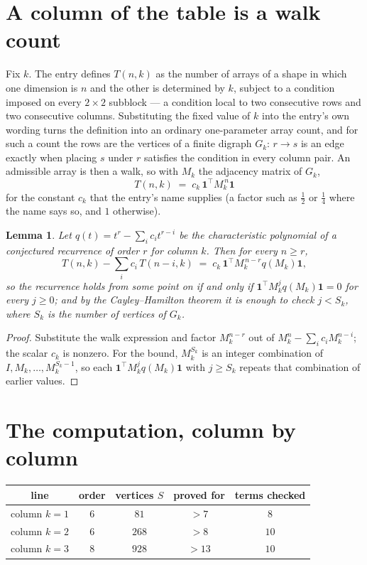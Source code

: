 \documentclass[11pt,a4paper]{article}
\theoremstyle{plain}
\newtheorem{lemma}[theorem]{Lemma}
\theoremstyle{definition}
\begin{document}
\section{A column of the table is a walk count}

Fix $k$. The entry defines $T(n,k)$ as the number of arrays of a shape in which one dimension
is $n$ and the other is determined by $k$, subject to a condition imposed on every
$2\times2$ subblock --- a condition local to two consecutive rows and two consecutive columns.
Substituting the fixed value of $k$ into the entry's own wording turns the definition into an
ordinary one-parameter array count, and for such a count the rows are the vertices of a finite
digraph $G_k$: $r\to s$ is an edge exactly when placing $s$ under $r$ satisfies the condition
in every column pair. An admissible array is then a walk, so with $M_k$ the adjacency matrix
of $G_k$,
\[
T(n,k)\;=\;c_k\,\mathbf{1}^{\!\top}M_k^{\,n}\mathbf{1}
\]
for the constant $c_k$ that the entry's name supplies (a factor such as $\tfrac12$ or
$\tfrac14$ where the name says so, and $1$ otherwise).

\begin{lemma}\label{lem:crit}
Let $q(t)=t^{r}-\sum_i c_it^{r-i}$ be the characteristic polynomial of a conjectured
recurrence of order $r$ for column $k$. Then for every $n\ge r$,
\[
T(n,k)-\sum_i c_i\,T(n-i,k)\;=\;c_k\,\mathbf{1}^{\!\top}M_k^{\,n-r}q(M_k)\mathbf{1},
\]
so the recurrence holds from some point on if and only if
$\mathbf{1}^{\!\top}M_k^{j}q(M_k)\mathbf{1}=0$ for every $j\ge0$; and by the
Cayley--Hamilton theorem it is enough to check $j<S_k$, where $S_k$ is the number of vertices
of $G_k$.
\end{lemma}

\begin{proof}
Substitute the walk expression and factor $M_k^{n-r}$ out of $M_k^{n}-\sum_ic_iM_k^{n-i}$;
the scalar $c_k$ is nonzero. For the bound, $M_k^{S_k}$ is an integer combination of
$I,M_k,\dots,M_k^{S_k-1}$, so each $\mathbf{1}^{\!\top}M_k^{j}q(M_k)\mathbf{1}$ with
$j\ge S_k$ repeats that combination of earlier values.
\end{proof}

\section{The computation, column by column}

\begin{center}
\begin{tabular}{ccccc}
line & order & vertices $S$ & proved for & terms checked \\ \hline
column $k$$=1$ & $6$ & $81$ & $>7$ & $8$ \\
column $k$$=2$ & $6$ & $268$ & $>8$ & $10$ \\
column $k$$=3$ & $8$ & $928$ & $>13$ & $10$ \\
\end{tabular}
\end{center}
\end{document}

